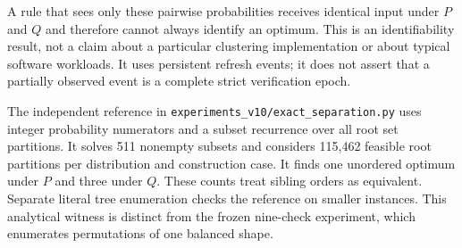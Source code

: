 A rule that sees only these pairwise probabilities receives identical
input under $P$ and $Q$ and therefore cannot always identify an optimum.
This is an identifiability result, not a claim about a particular clustering
implementation or about typical software workloads. It uses persistent
refresh events; it does not assert that a partially observed event is a
complete strict verification epoch.

The independent reference in \texttt{experiments\_v10/exact\_separation.py}
uses integer probability numerators and a subset recurrence over all root
set partitions. It solves 511 nonempty subsets and considers 115,462 feasible
root partitions per distribution and construction case. It finds one
unordered optimum under $P$ and three under $Q$. These counts treat sibling
orders as equivalent. Separate literal tree enumeration checks the reference
on smaller instances. This analytical witness is distinct from the frozen
nine-check experiment, which enumerates permutations of one balanced shape.
